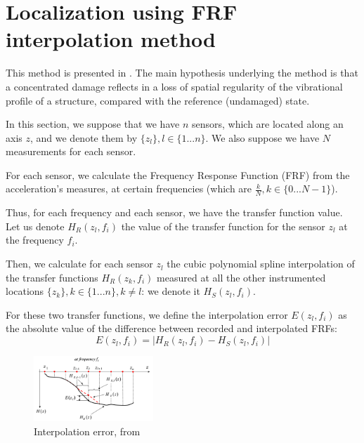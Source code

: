 \documentclass[journal]{IEEEtran}
\begin{document}


\section{Localization using FRF interpolation method}


This method is presented in \cite{dilena2015damage}.
The main hypothesis underlying the method is that a concentrated damage reflects in a loss of spatial regularity of the
vibrational profile of a structure, compared with the reference (undamaged) state.

In this section, we suppose that we have $n$ sensors, which are located along an axis $z$, and we denote them by
$\{z_l\}, l\in \{1 ... n\}$. We also suppose we have $N$ measurements for each sensor.

For each sensor, we calculate the Frequency Response Function (FRF) from the acceleration's measures, at certain frequencies 
(which are $\frac{k}{N}, k \in \{0 ... N-1\}$).

Thus, for each frequency and each sensor, we have the transfer function value. Let us denote $H_R(z_l,f_i)$ the value of the transfer function for  the sensor $z_l$ at the frequency $f_i$.

Then, we calculate for each sensor $z_l$ the cubic polynomial spline interpolation of the transfer functions $H_R(z_k,f_i)$ measured at all 
the other instrumented locations $\{z_k\}, k\in \{1 ... n\}, k \neq l$: we denote it $H_S(z_l,f_i)$.

For these two transfer functions, we define the interpolation error $E(z_l,f_i)$ as the absolute value of the difference between recorded and interpolated FRFs:
\begin{equation}
E(z_l,f_i) = | H_R(z_l,f_i) - H_S(z_l,f_i) |
\end{equation}


\begin{figure}
  \centering
  \includegraphics[width=0.4\textwidth]{images/interpolation.png}
  \caption{Interpolation error, from \cite{dilena2015damage}}
  \label{interpolation_error}
\end{figure}
\end{document}
